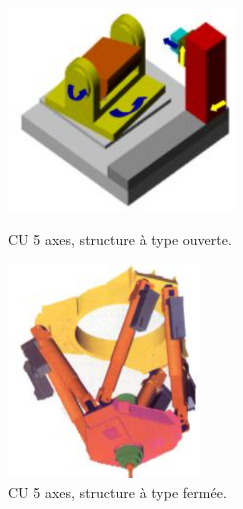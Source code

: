 \documentclass[12pt]{article}
\begin{document}
\begin{figure}[h!]
\begin{minipage}{.55\linewidth}

\centering
\includegraphics[width=0.6\linewidth]{S1.PNG}
\caption{CU 5 axes, structure à type ouverte.}
\label{S1}

\end{minipage}
\begin{minipage}{.44\linewidth}

\centering
\includegraphics[width=0.6\linewidth]{S2.PNG}
\caption{CU 5 axes, structure à type fermée.}
\label{S2}

\end{minipage}
\end{figure}
\end{document}
